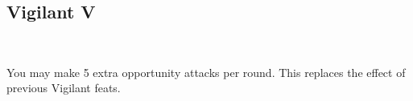 \subsection*{Vigilant V}\label{feat:vigilant5}
 \\

You may make 5 extra opportunity attacks per round. This replaces the effect
of previous Vigilant feats.
